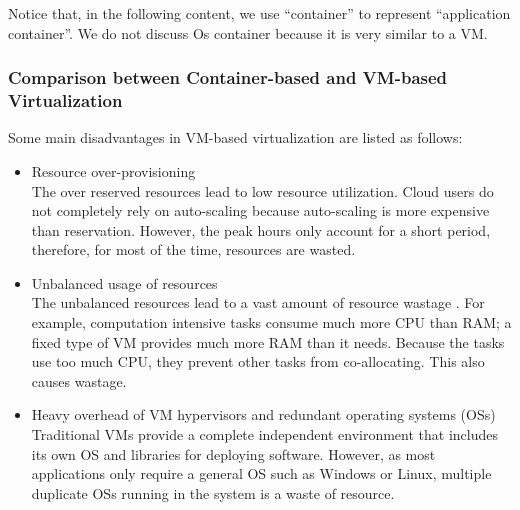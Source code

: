 Notice that, in the following content, we use ``container'' to represent ``application container''. 
We do not discuss Os container because it is very similar to a VM.


\subsubsection{Comparison between Container-based and VM-based Virtualization} 
\label{sec:comparison_container_vm}


Some main disadvantages in VM-based virtualization are listed as follows:
\begin{itemize}
	\item Resource over-provisioning \\
	 The over reserved resources lead to low resource utilization. Cloud users do not completely rely on auto-scaling because auto-scaling is more expensive than reservation. However, the peak hours only account for a short period, therefore, for most of the time, resources are wasted.

	\item Unbalanced usage of resources \\
	 The unbalanced resources lead to a vast amount of resource wastage \cite{Tomas:2013iv}. For example, computation intensive tasks consume much more CPU than RAM; a fixed type of VM provides much more RAM than it needs. Because the tasks use too much CPU, they prevent other tasks from co-allocating. This also causes wastage.

	\item Heavy overhead of VM hypervisors and redundant operating systems (OSs) \\
	 Traditional VMs provide a complete independent environment that includes its own OS and libraries for deploying software. However, as most applications only require a general OS such as Windows or Linux, multiple duplicate OSs running in the system is a waste of resource.
\end{itemize}


